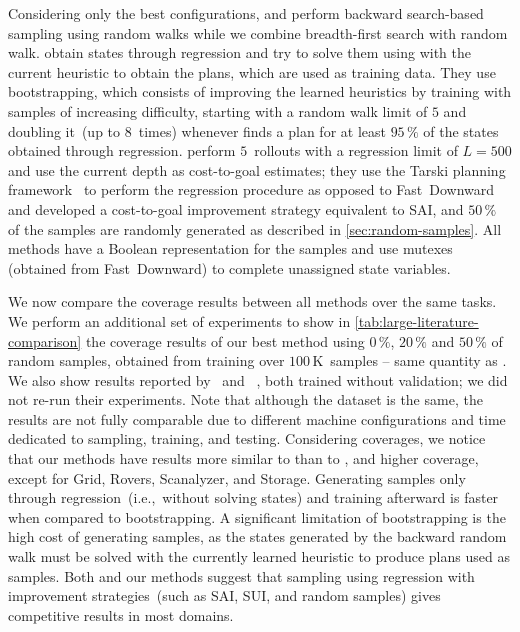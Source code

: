 Considering only the best configurations, \citet{ferber2022neural} and \citet{otoole2022sampling} perform backward search-based sampling using random walks while we combine breadth-first search with random walk. \citet{ferber2022neural} obtain states through regression and try to solve them using \gbfs with the current heuristic to obtain the plans, which are used as training data. They use bootstrapping, which consists of improving the learned heuristics by training with samples of increasing difficulty, starting with a random walk limit of $5$ and doubling it~(up to $8$~times) whenever \gbfs finds a plan for at least $95\,\%$ of the states obtained through regression. \citet{otoole2022sampling} perform $5$~rollouts with a regression limit of $L=500$ and use the current depth as cost-to-goal estimates; they use the Tarski planning framework~\cite{tarski2018github} to perform the regression procedure as opposed to Fast~Downward and developed a cost-to-goal improvement strategy equivalent to SAI, and $50\,\%$ of the samples are randomly generated as described in \cref{sec:random-samples}. All methods have a Boolean representation for the samples and use mutexes (obtained from Fast~Downward) to complete unassigned state variables.

We now compare the coverage results between all methods over the same tasks. We perform an additional set of experiments to show in \cref{tab:large-literature-comparison} the coverage results of our best method using $0\,\%$, $20\,\%$ and $50\,\%$ of random samples, obtained from training over $100$\,K~samples -- same quantity as \citet{otoole2022sampling}. We also show results reported by \citet{ferber2022neural}~\hboot and \citet{otoole2022sampling}~\hnrsl, both trained without validation; we did not re-run their experiments. Note that although the dataset is the same, the results are not fully comparable due to different machine configurations and time dedicated to sampling, training, and testing. Considering coverages, we notice that our methods have results more similar to \hnrsl than to \hboot, and higher coverage, except for Grid, Rovers, Scanalyzer, and Storage. Generating samples only through regression~(i.e.,~without solving states) and training afterward is faster when compared to bootstrapping. A significant limitation of bootstrapping is the high cost of generating samples, as the states generated by the backward random walk must be solved with the currently learned heuristic to produce plans used as samples. Both \hnrsl and our methods suggest that sampling using regression with improvement strategies~(such as SAI, SUI, and random samples) gives competitive results in most domains.

